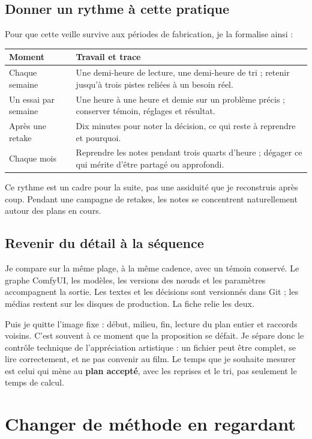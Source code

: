 \documentclass[11pt,a4paper]{article}
\begin{document}
\subsection{Donner un rythme à cette pratique}
Pour que cette veille survive aux périodes de fabrication, je la formalise ainsi :\par
{\small\renewcommand{\arraystretch}{1.15}
\begin{tabularx}{\linewidth}{@{}p{31mm}Y@{}}
\toprule
\textbf{Moment} & \textbf{Travail et trace}\\ \midrule
Chaque semaine & Une demi-heure de lecture, une demi-heure de tri ; retenir jusqu'à trois pistes reliées à un besoin réel.\\
Un essai par semaine & Une heure à une heure et demie sur un problème précis ; conserver témoin, réglages et résultat.\\
Après une retake & Dix minutes pour noter la décision, ce qui reste à reprendre et pourquoi.\\
Chaque mois & Reprendre les notes pendant trois quarts d'heure ; dégager ce qui mérite d'être partagé ou approfondi.\\
\bottomrule
\end{tabularx}}

Ce rythme est un cadre pour la suite, pas une assiduité que je reconstruis après coup. Pendant une campagne de retakes, les notes se concentrent naturellement autour des plans en cours.

\subsection{Revenir du détail à la séquence}
Je compare sur la même plage, à la même cadence, avec un témoin conservé. Le graphe ComfyUI, les modèles, les versions des nœuds et les paramètres accompagnent la sortie. Les textes et les décisions sont versionnés dans Git ; les médias restent sur les disques de production. La fiche relie les deux.

Puis je quitte l'image fixe : début, milieu, fin, lecture du plan entier et raccords voisins. C'est souvent à ce moment que la proposition se défait. Je sépare donc le contrôle technique de l'appréciation artistique : un fichier peut être complet, se lire correctement, et ne pas convenir au film. Le temps que je souhaite mesurer est celui qui mène au \textbf{plan accepté}, avec les reprises et le tri, pas seulement le temps de calcul.
\newpage
\section{Changer de méthode en regardant}
\end{document}

